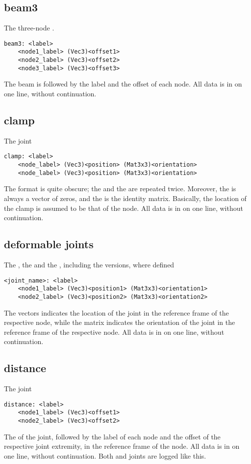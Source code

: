 \subsection{beam3}
The three-node .
\begin{verbatim}
beam3: <label>
    <node1_label> (Vec3)<offset1>
    <node2_label> (Vec3)<offset2>
    <node3_label> (Vec3)<offset3>
\end{verbatim}
The beam  is followed by the label and the offset of each node.
All data is in on one line, without continuation.

\subsection{clamp}
The  joint
\begin{verbatim}
clamp: <label>
    <node_label> (Vec3)<position> (Mat3x3)<orientation>
    <node_label> (Vec3)<position> (Mat3x3)<orientation>
\end{verbatim}
The format is quite obscure; the  and the 
are repeated twice.
Moreover, the  is always a vector of zeros,
and the  is the identity matrix.
Basically, the location of the clamp is assumed to be that of the node.
All data is in on one line, without continuation.

\subsection{deformable joints}
The , the 
and the , including the 
versions, where defined
\begin{verbatim}
<joint_name>: <label>
    <node1_label> (Vec3)<position1> (Mat3x3)<orientation1>
    <node2_label> (Vec3)<position2> (Mat3x3)<orientation2>
\end{verbatim}
The  vectors indicates the location of the joint
in the reference frame of the respective node,
while the matrix  indicates the orientation of the joint
in the reference frame of the respective node.
All data is in on one line, without continuation.

\subsection{distance}
The  joint
\begin{verbatim}
distance: <label>
    <node1_label> (Vec3)<offset1>
    <node2_label> (Vec3)<offset2>
\end{verbatim}
The  of the joint, followed by the label of each node
and the offset of the respective joint extremity,
in the reference frame of the node.
All data is in on one line, without continuation.
Both  and  joints are logged
like this.

